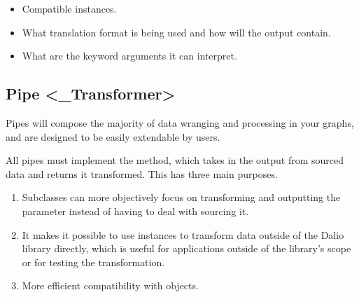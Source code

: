 \documentclass[letterpaper,10pt,english]{sphinxmanual}
\begin{document}
\begin{itemize}
\item {} 
Compatible  instances.

\item {} 
What translation format is being used and how will the output contain.

\item {} 
What are the keyword arguments it can interpret.

\end{itemize}


\subsection{Pipe \textless{}\_Transformer\textgreater{}}
\label{\detokenize{beginners-guide:pipe-transformer}}


Pipes will compose the majority of data wranging and processing in your graphs, and are designed to be easily extendable by users.

All pipes must implement the  method, which takes in the output from sourced data and returns it transformed. This has three main purposes.
\begin{enumerate}
%
\item {} 
Subclasses can more objectively focus on transforming and outputting the  parameter instead of having to deal with sourcing it.

\item {} 
It makes it possible to use  instances to transform data outside of the Dal\sphinxhyphen{}io library directly, which is useful for applications outside of the library’s scope or for testing the transformation.

\item {} 
More efficient compatibility with {\hyperref[\detokenize{beginners-guide:pipeline}]{}} objects.

\end{enumerate}
\end{document}
